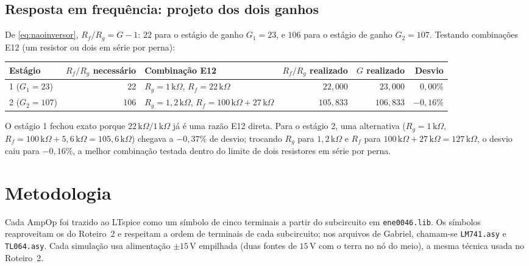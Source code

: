 \documentclass[11pt,a4paper]{article}
\begin{document}
\subsection{Resposta em frequência: projeto dos dois ganhos}

De \eqref{eq:naoinversor}, \(R_f/R_g=G-1\): \(22\) para o estágio de ganho \(G_1=23\), e \(106\)
para o estágio de ganho \(G_2=107\). Testando combinações E12 (um resistor ou dois em série por
perna):

\begin{center}\small
\setlength{\tabcolsep}{4pt}
\begin{tabular}{@{}lrlrrr@{}}
\toprule
\textbf{Estágio} & \textbf{\(R_f/R_g\) necessário} & \textbf{Combinação E12} &
\textbf{\(R_f/R_g\) realizado} & \textbf{\(G\) realizado} & \textbf{Desvio} \\
\midrule
1 (\(G_1=23\)) & 22 & \(R_g{=}1\,\text{k}\Omega\), \(R_f{=}22\,\text{k}\Omega\) &
  \(22{,}000\) & \(23{,}000\) & \(0{,}00\%\) \\
2 (\(G_2=107\)) & 106 & \(R_g{=}1{,}2\,\text{k}\Omega\), \(R_f{=}100\,\text{k}\Omega{+}27\,\text{k}\Omega\) &
  \(105{,}833\) & \(106{,}833\) & \(-0{,}16\%\) \\
\bottomrule
\end{tabular}
\end{center}

O estágio 1 fechou exato porque \(22\,\text{k}\Omega/1\,\text{k}\Omega\) já é uma razão E12
direta. Para o estágio 2, uma alternativa (\(R_g{=}1\,\text{k}\Omega\),
\(R_f{=}100\,\text{k}\Omega{+}5{,}6\,\text{k}\Omega=105{,}6\,\text{k}\Omega\)) chegava a
\(-0{,}37\%\) de desvio; trocando \(R_g\) para \(1{,}2\,\text{k}\Omega\) e \(R_f\) para
\(100\,\text{k}\Omega{+}27\,\text{k}\Omega=127\,\text{k}\Omega\), o desvio caiu para
\(-0{,}16\%\), a melhor combinação testada dentro do limite de dois resistores em série por
perna.

\section{Metodologia}
\label{sec:metodo}

Cada AmpOp foi trazido ao LTspice como um símbolo de cinco terminais a partir do subcircuito em
\texttt{ene0046.lib}. Os símbolos reaproveitam os do Roteiro~2 e respeitam a ordem de
terminais de cada subcircuito; nos arquivos de Gabriel, chamam-se \texttt{LM741.asy} e \texttt{TL064.asy}. Cada
simulação usa alimentação \(\pm15\,\text{V}\) empilhada (duas fontes de \(15\,\text{V}\) com o
terra no nó do meio), a mesma técnica usada no Roteiro~2.
\end{document}
